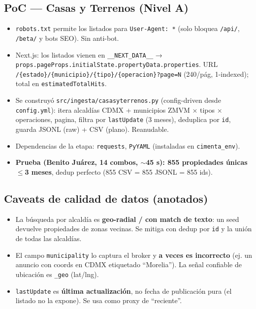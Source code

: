 \documentclass[11pt]{article}
\newcommand{\codigo}[1]{\texttt{#1}}
\begin{document}
\subsection*{PoC — Casas y Terrenos (Nivel A)}
\begin{itemize}
  \item \codigo{robots.txt} permite los listados para \codigo{User-Agent: *}
        (solo bloquea \codigo{/api/}, \codigo{/beta/} y bots SEO). Sin anti-bot.
  \item Next.js: los listados vienen en \codigo{\_\_NEXT\_DATA\_\_} →
        \codigo{props.pageProps.initialState.propertyData.properties}.
        URL \codigo{/\{estado\}/\{municipio\}/\{tipo\}/\{operacion\}?page=N}
        (240/pág, 1-indexed); total en \codigo{estimatedTotalHits}.
  \item Se construyó \codigo{src/ingesta/casasyterrenos.py} (config-driven desde
        \codigo{config.yml}): itera alcaldías CDMX + municipios ZMVM × tipos ×
        operaciones, pagina, filtra por \codigo{lastUpdate} (3 meses), deduplica
        por \codigo{id}, guarda JSONL (raw) + CSV (plano). Reanudable.
  \item Dependencias de la etapa: \codigo{requests}, \codigo{PyYAML}
        (instaladas en \codigo{cimenta\_env}).
  \item \textbf{Prueba (Benito Juárez, 14 combos, $\sim$45 s): 855 propiedades
        únicas $\leq$3 meses}, dedup perfecto (855 CSV = 855 JSONL = 855 ids).
\end{itemize}

\subsection*{Caveats de calidad de datos (anotados)}
\begin{itemize}
  \item La búsqueda por alcaldía es \textbf{geo-radial / con match de texto}:
        un seed devuelve propiedades de zonas vecinas. Se mitiga con dedup por
        \codigo{id} y la unión de todas las alcaldías.
  \item El campo \codigo{municipality} lo captura el broker y \textbf{a veces es
        incorrecto} (ej. un anuncio con coords en CDMX etiquetado ``Morelia'').
        La señal confiable de ubicación es \codigo{\_geo} (lat/lng).
  \item \codigo{lastUpdate} es \textbf{última actualización}, no fecha de
        publicación pura (el listado no la expone). Se usa como proxy de
        ``reciente''.
\end{itemize}
\end{document}
